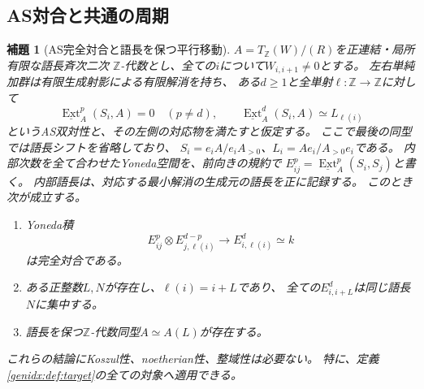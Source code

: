 \documentclass[11pt,a4paper]{ltjsarticle}
\newtheorem{lemma}[theorem]{補題}
\theoremstyle{definition}
\begin{document}
\subsection{AS対合と共通の周期}\label{genidx:subsec:as-preliminaries}
\begin{lemma}[AS完全対合と語長を保つ平行移動]
\label{genidx:lem:as-translation}
$A=T_{\mathbb Z}(W)/(R)$を正連結・局所有限な語長斉次二次
$\mathbb Z$-代数とし、全ての$i$について$W_{i,i+1}\ne0$とする。
左右単純加群は有限生成射影による有限解消を持ち、
ある$d\ge1$と全単射$\ell:\mathbb Z\to\mathbb Z$に対して
\[
 \underline{\operatorname{Ext}}^p_A(S_i,A)=0\quad(p\ne d),
 \qquad
 \underline{\operatorname{Ext}}^d_A(S_i,A)\simeq L_{\ell(i)}
\]
というAS双対性と、その左側の対応物を満たすと仮定する。
ここで最後の同型では語長シフトを省略しており、
$S_i=e_iA/e_iA_{>0}$、$L_i=Ae_i/A_{>0}e_i$である。
内部次数を全て合わせたYoneda空間を、前向きの規約で
$E^p_{ij}=\underline{\operatorname{Ext}}^p_A(S_i,S_j)$と書く。
内部語長は、対応する最小解消の生成元の語長を正に記録する。
このとき次が成立する。
\begin{enumerate}
\item Yoneda積
\[
 E^p_{ij}\otimes E^{d-p}_{j,\ell(i)}
 \longrightarrow E^d_{i,\ell(i)}\simeq k
\]
は完全対合である。
\item ある正整数$L,N$が存在し、$\ell(i)=i+L$であり、
全ての$E^d_{i,i+L}$は同じ語長$N$に集中する。
\item 語長を保つ$\mathbb Z$-代数同型$A\simeq A(L)$が存在する。
\end{enumerate}
これらの結論にKoszul性、noetherian性、整域性は必要ない。
特に、定義\ref{genidx:def:target}の全ての対象へ適用できる。
\end{lemma}
\end{document}
